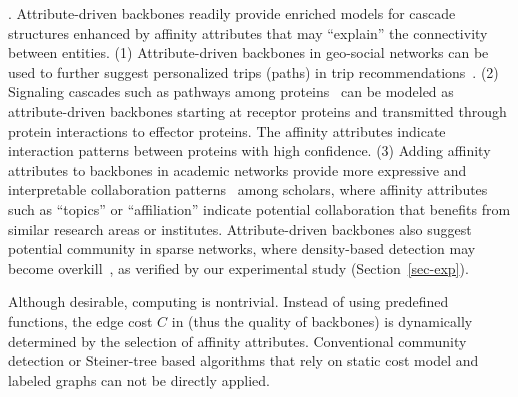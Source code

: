 . 
Attribute-driven backbones readily provide enriched models 
for cascade structures enhanced by affinity attributes 
that may ``explain'' the connectivity between 
entities. 
(1) Attribute-driven backbones in geo-social networks 
can be used to further suggest personalized trips 
(paths) in trip recommendations~\cite{cheng2011personalized}. (2)
Signaling cascades such as 
pathways among proteins~\cite{bailly2011finding} 
can be modeled as attribute-driven backbones 
starting at receptor proteins and transmitted through protein interactions to effector proteins. 
The affinity attributes indicate interaction 
patterns between proteins with high confidence. 
(3) Adding affinity attributes to backbones in 
academic networks provide more expressive 
and interpretable collaboration patterns~\cite{newman2004coauthorship} among scholars, where affinity attributes 
such as ``topics'' or ``affiliation'' 
indicate potential collaboration that benefits 
from similar research areas or institutes. 
Attribute-driven backbones also suggest potential community in sparse networks, where density-based
detection may
become overkill~\cite{chiang2013steiner}, 
as verified by our experimental 
study (Section~\ref{sec-exp}).





\vspace{.5ex}
Although desirable, computing \abd is nontrivial.
Instead of using predefined
functions, the edge cost $C$ in \abd
(thus the quality of backbones) is dynamically determined
by the selection of affinity attributes.
Conventional community detection 
or Steiner-tree based algorithms \cite{chiang2013steiner}
that rely on static cost model
and labeled graphs can not be directly
applied.

